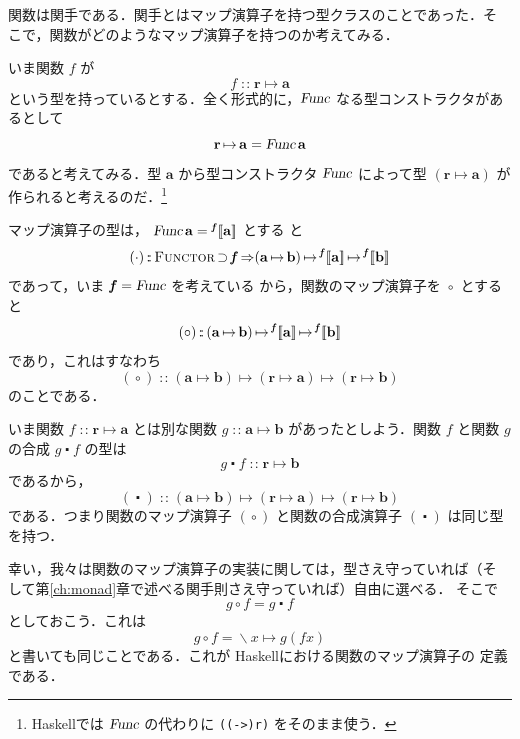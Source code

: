 \documentclass[a5paper,twoside,fleqn,draft]{jsbook}
\def\[{[\![}
\def\]{]\!]}
\newcommand{\programminglanguage}[1]{\textsf{#1}}
\newcommand{\haskell}{\programminglanguage{Haskell}}
\newcommand{\code}[1]{\texttt{#1}}
\DeclareMathOperator{\mSuperClass}{\Rightarrow}
\DeclareMathOperator{\mSuperSet}{\supset}
\DeclareMathOperator{\mComp}{\centerdot}
\DeclareMathOperator{\mFuncArrow}{\mapsto}
\DeclareMathOperator{\mIn}{{:\!:}}
\DeclareMathOperator{\mLambda}{\backslash}
\DeclareMathOperator{\mLambdaArrow}{\mapsto}
\DeclareMathOperator{\mMap}{\cdot}
\DeclareMathOperator{\mMapFunc}{\circ}
\newcommand{\mType}[1]{\mathbf{#1}} %
\newcommand{\mPolymorphicTypeParameter}[1]{\textbf{\textit{#1}}}
\newcommand{\mA}{\mType{a}}
\newcommand{\mB}{\mType{b}}
\newcommand{\mR}{\mType{r}}
\newcommand{\mPolymorphicTypeAssemble}[2]{{}^\mPolymorphicTypeParameter{#1}\[\mType{#2}\]}
\newcommand{\mTypeConstructor}[1]{\textsl{#1}}
\DeclareMathOperator{\mFuncTypeConstructor}{\mTypeConstructor{Func}}
\newcommand{\mTypeClass}[1]{\textsc{#1}} %
\newcommand{\mFunctorTypeClass}{\mTypeClass{Functor}}
\newcommand{\mLambdaEXP}[2]{\mLambda{#1}\mLambdaArrow{#2}} %
\newcommand{\mProjEXP}[2]{#1\mFuncArrow#2} %
\begin{document}
関数は関手である．関手とはマップ演算子を持つ型クラスのことであった．そ
こで，関数がどのようなマップ演算子を持つのか考えてみる．

いま関数 $f$ が
\begin{equation}
  f
  \mIn\mR\mFuncArrow\mA
\end{equation}
という型を持っているとする．全く形式的に，$\mFuncTypeConstructor$
なる型コンストラクタがあるとして
\begin{equation}
  \mR\mFuncArrow\mA=\mFuncTypeConstructor\mA
\end{equation}
であると考えてみる．型 $\mA$ から型コンストラクタ
$\mFuncTypeConstructor$ によって型 $(\mProjEXP{\mR}{\mA})$ が
作られると考えるのだ．\footnote{\haskell では $\mFuncTypeConstructor$
  の代わりに \code{((->)r)} をそのまま使う．}

マップ演算子の型は，
$\mFuncTypeConstructor\mA=\mPolymorphicTypeAssemble{f}{\mA}$ とする
と
\begin{equation}
  (\mMap)
  \mIn{}\mFunctorTypeClass\mSuperSet\mPolymorphicTypeParameter{f}
  \mSuperClass(\mA\mFuncArrow\mB)
  \mFuncArrow\mPolymorphicTypeAssemble{f}{a}
  \mFuncArrow\mPolymorphicTypeAssemble{f}{b}
\end{equation}
であって，いま
$\mPolymorphicTypeParameter{f}=\mFuncTypeConstructor$ を考えている
から，関数のマップ演算子を $\mMapFunc$ とすると
\begin{equation}
  (\mMapFunc)
  \mIn{}(\mA\mFuncArrow\mB)
  \mFuncArrow\mPolymorphicTypeAssemble{f}{\mA}
  \mFuncArrow\mPolymorphicTypeAssemble{f}\mB
\end{equation}
であり，これはすなわち
\begin{equation}
  (\mMapFunc)
  \mIn{}(\mA\mFuncArrow\mB)
  \mFuncArrow(\mR\mFuncArrow\mA)
  \mFuncArrow(\mR\mFuncArrow\mB)
\end{equation}
のことである．

いま関数 $f\mIn\mProjEXP{\mR}{\mA }$ とは別な関数
$g\mIn\mProjEXP{\mA }{\mB }$ があったとしよう．関数 $f$ と関数
$g$ の合成 $g\mComp f$ の型は
\begin{equation}
g\mComp f\mIn\mProjEXP{\mR}{\mB }
\end{equation}
であるから，
\begin{equation}
(\mComp)\mIn{}\mProjEXP{\mProjEXP{(\mProjEXP{\mA }{\mB })}{(\mProjEXP{\mR}{\mA })}}
  {(\mProjEXP{\mR}{\mB })}
\end{equation}
である．つまり関数のマップ演算子 $(\mMapFunc)$ と関数の合成演算子
$(\mComp)$ は同じ型を持つ．

幸い，我々は関数のマップ演算子の実装に関しては，型さえ守っていれば（そ
  して第\ref{ch:monad}章で述べる関手則さえ守っていれば）自由に選べる．
そこで
\begin{equation}
  g\mMapFunc f
  =g\mComp f
\end{equation}
としておこう．これは
\begin{equation}
  g\mMapFunc f
  =\mLambdaEXP{x}{g(fx)}
\end{equation}
と書いても同じことである．これが \haskell における関数のマップ演算子の
定義である．
\end{document}
